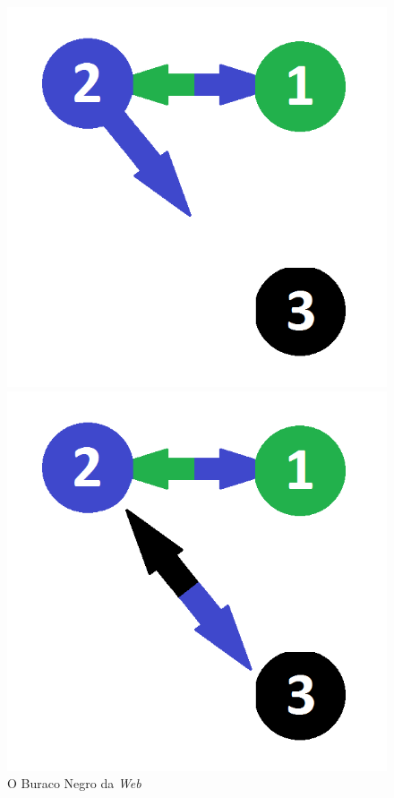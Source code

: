 \documentclass{beamer}
\begin{document}
\begin{frame}
\begin{figure}[!htb]
	\centering
	\includegraphics[scale=0.20]{figures/blackhole1}
	\includegraphics[scale=0.20]{figures/blackhole2}\\
	{\scriptsize O Buraco Negro da \textit{Web}}
\end{figure}	 

\end{frame}
\end{document}
